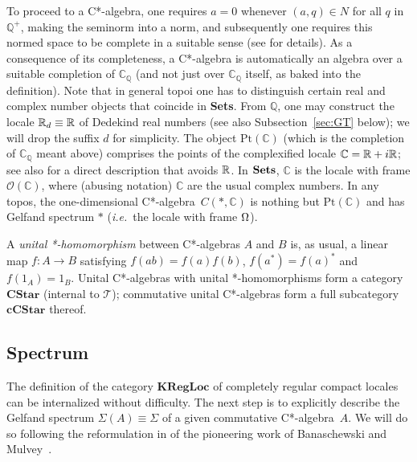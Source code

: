 \documentclass[12pt]{article}
\newcommand{\Q}{\mathbb{Q}}
\newcommand{\Sets}{\mbox{\textbf{Sets}}}
\newcommand{\ca}{C*-algebra} \newcommand{\jba}{JB-algebra}
\newcommand{\Sg}{\Sigma} \newcommand{\ta}{\tau} \newcommand{\ph}{\phi}
\newcommand{\CO}{{\mathcal O}} \newcommand{\CP}{{\mathcal P}}
\newcommand{\CT}{{\mathcal T}} \newcommand{\CV}{{\mathcal V}}
\newcommand{\C}{{\mathbb C}} \newcommand{\D}{{\mathbb D}}
\newcommand{\Cat}[1]{\ensuremath{\mathrm{\textbf{#1}}}}
\newcommand{\Cstar}{\Cat{CStar}\xspace}
\newcommand{\Ccstar}{\Cat{cCStar}\xspace}
\newcommand{\cpxrat}{\ensuremath{\field{C}_\field{Q}}}
\newcommand{\field}[1]{\ensuremath{\mathbb{#1}}}
\newcommand{\ie}{\textit{i.e.}}
\begin{document}
To proceed to a C*-algebra, one requires $a=0$ whenever
$(a,q)\in N$ for all $q$ in $\field{Q}^+$, making the seminorm into a
norm, and subsequently one requires this normed space to be complete in a
suitable sense (see \cite{banaschewskimulvey06} for details).
As a  consequence of its completeness, a C*-algebra is automatically an algebra
over
a suitable completion of $\cpxrat$ (and not just over $\cpxrat$ itself, as baked
into the definition).
Note that in general topoi one has to distinguish certain real and complex
number objects that coincide in \Sets.
From $\Q$, one may construct  the locale  ${\mathbb R}_d\equiv{\mathbb R}$ of Dedekind real numbers
\cite[\S~VI.8]{maclanemoerdijk92} (see also
Subsection~\ref{sec:GT} below); we will drop the suffix $d$ for simplicity.  The object $\mathrm{Pt}(\C)$ (which
is the completion of $\cpxrat$ meant above)
 comprises the points of the
complexified locale $\C=\R+i\R$; see also \cite{banaschewskimulvey06} for
a direct description that avoids ${\mathbb R}$.
 In $\Sets$, $\C$ is the locale with frame $\CO(\C)$, where (abusing notation) $\C$ are the usual
complex numbers. In any topos,
the one-dimensional \ca\ $C(*,\C)$
is nothing but $\mathrm{Pt}(\C)$ and has Gelfand spectrum $*$ (\ie\ the locale
with frame $\Omega$).

A \emph{unital *-homomorphism} between C*-algebras ${A}$
and ${B}$ is, as usual,  a linear map $f:{A}\to{B}$ satisfying
$f(ab)=f(a)f(b)$, $f(a^*) = {f(a)}^*$ and $f(1_A)=1_B$.  Unital C*-algebras
with unital *-homomorphisms form a category $\Cstar$ (internal to $\CT$);
commutative unital C*-algebras form a full subcategory $\Ccstar$ thereof.
\subsection{Spectrum}\label{subsec:spectrum}
The definition of the category $\Cat{KRegLoc}$ of completely regular compact
locales
can be internalized without difficulty. The next step is to explicitly describe
the Gelfand spectrum $\Sg({A})\equiv\Sg$ of a given commutative \ca\ ${A}$. We
will do so following  the reformulation in
\cite{coquand05,CoquandSpitters:cstar} of the pioneering work of
Banaschewski and Mulvey~\cite{banaschewskimulvey06}.
\end{document}
